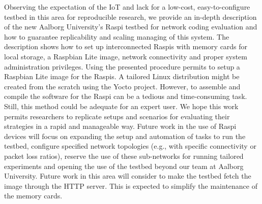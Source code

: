 \label{sec:conclusions}
Observing the expectation of the \ac{IoT} and lack for a low-cost, easy-to-configure testbed in this area for reproducible research, we provide an in-depth description of the new Aalborg University's \ac{Raspi} testbed for network coding evaluation and how to guarantee replicability and scaling managing of this system. The description shows how to set up interconnected \ac{Raspi}s with memory cards for local storage, a Raspbian Lite image, network connectivity and proper system administration privileges. Using the presented procedure permits to setup a Raspbian Lite image for the \ac{Raspi}s. A tailored Linux distribution might be created from the scratch using the Yocto project. However, to assemble and compile the software for the \ac{Raspi} can be a tedious and time-consuming task. Still, this method could be adequate for an expert user. We hope this work permits researchers to replicate setups and scenarios for evaluating their strategies in a rapid and manageable way. Future work in the use of \ac{Raspi} devices will focus on expanding the setup and automation of tasks to run the testbed, configure specified network topologies (e.g., with specific connectivity or packet loss ratios), reserve the use of these sub-networks for running tailored experiments and opening the use of the testbed beyond our team at Aalborg University. Future work in this area will consider to make the testbed fetch the image through the \ac{HTTP} server. This is expected to simplify the maintenance of the memory cards.
